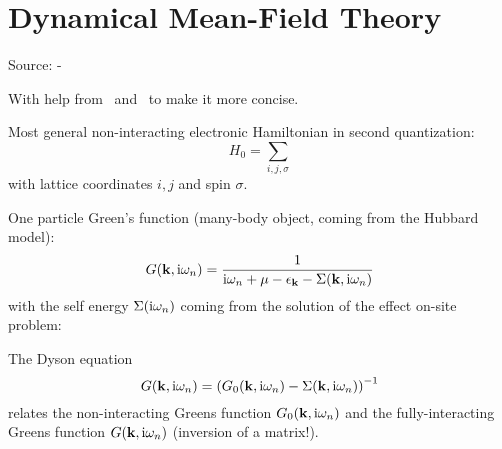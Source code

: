 \chapter{Dynamical Mean-Field Theory}\label{ch:dynamical-mean-field-theory}

Source: \citeauthor{Georges_Kotliar_Krauth_Rozenberg_1996} -~~\cite{Georges_Kotliar_Krauth_Rozenberg_1996}

With help from~\cite{Schüler} and~\cite{Werner} to make it more concise.

Most general non-interacting electronic Hamiltonian in second quantization:
\begin{equation}
    H_0 = \sum_{i, j, \sigma}
\end{equation}
with lattice coordinates \(i, j\) and spin \(\sigma\).



One particle Green's function (many-body object, coming from the Hubbard model):
\begin{equation}
    G(\mathbf{k}, \mathrm{i} \omega_n) = \frac{1}{\mathrm{i} \omega_n + \mu - \epsilon_{\mathbf{k}} - \Sigma(\mathbf{k}, \mathrm{i} \omega_n)}
\end{equation}
with the self energy \(\Sigma(\mathrm{i} \omega_n)\) coming from the solution of the effect on-site problem:

The Dyson equation
\begin{equation}
    G(\mathbf{k}, \mathrm{i} \omega_n) = \left( G_0 (\mathbf{k}, \mathrm{i} \omega_n) - \Sigma(\mathbf{k}, \mathrm{i} \omega_n)\right)^{-1}
\end{equation}
relates the non-interacting Greens function \(G_0 (\mathbf{k}, \mathrm{i} \omega_n)\) and the fully-interacting Greens function \(G (\mathbf{k}, \mathrm{i} \omega_n)\) (inversion of a matrix!).





